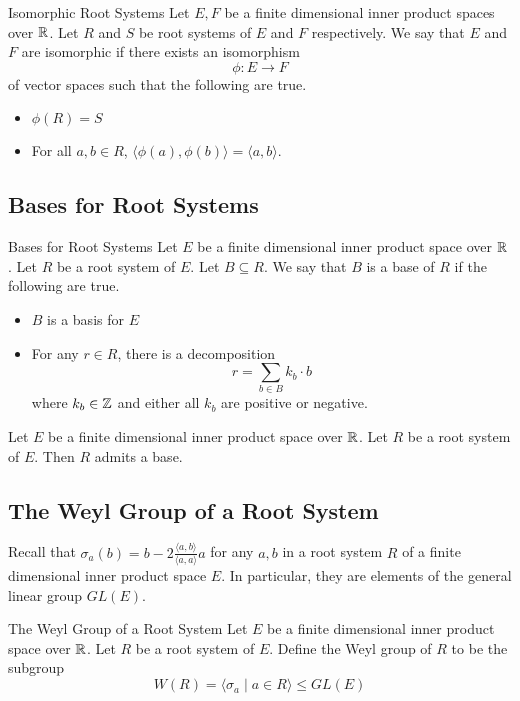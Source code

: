 \documentclass[a4paper]{article}
\begin{document}
\begin{defn}{Isomorphic Root Systems}{} Let $E,F$ be a finite dimensional inner product spaces over $\mathbb{R}$. Let $R$ and $S$ be root systems of $E$ and $F$ respectively. We say that $E$ and $F$ are isomorphic if there exists an isomorphism $$\phi:E\to F$$ of vector spaces such that the following are true. 
\begin{itemize}
\item $\phi(R)=S$
\item For all $a,b\in R$, $\langle\phi(a),\phi(b)\rangle=\langle a,b\rangle$. 
\end{itemize}
\end{defn}

\subsection{Bases for Root Systems}
\begin{defn}{Bases for Root Systems}{} Let $E$ be a finite dimensional inner product space over $\mathbb{R}$. Let $R$ be a root system of $E$. Let $B\subseteq R$. We say that $B$ is a base of $R$ if the following are true. 
\begin{itemize}
\item $B$ is a basis for $E$
\item For any $r\in R$, there is a decomposition $$r=\sum_{b\in B}k_b\cdot b$$ where $k_b\in\mathbb{Z}$ and either all $k_b$ are positive or negative. 
\end{itemize}
\end{defn}

\begin{prp}{}{} Let $E$ be a finite dimensional inner product space over $\mathbb{R}$. Let $R$ be a root system of $E$. Then $R$ admits a base. 
\end{prp}

\subsection{The Weyl Group of a Root System}
Recall that $\sigma_a(b)=b-2\frac{\langle a,b\rangle}{\langle a,a\rangle}a$ for any $a,b$ in a root system $R$ of a finite dimensional inner product space $E$. In particular, they are elements of the general linear group $GL(E)$. 

\begin{defn}{The Weyl Group of a Root System}{} Let $E$ be a finite dimensional inner product space over $\mathbb{R}$. Let $R$ be a root system of $E$. Define the Weyl group of $R$ to be the subgroup $$W(R)=\langle\sigma_a\;|\;a\in R\rangle\leq GL(E)$$
\end{defn}
\end{document}
